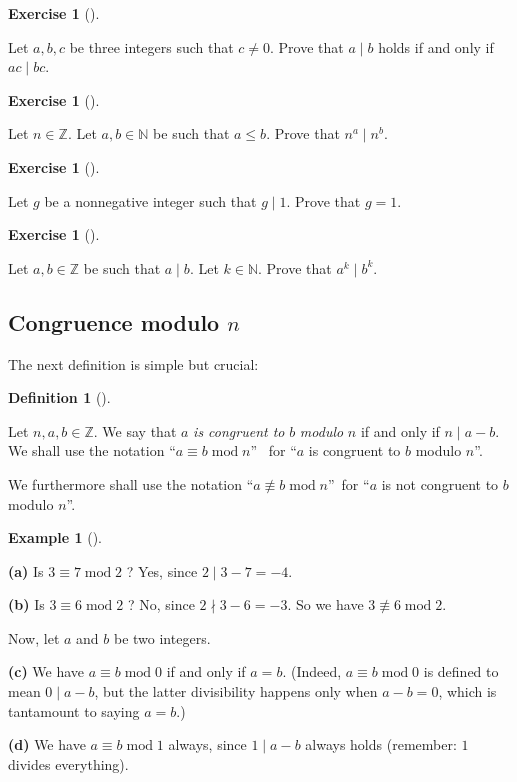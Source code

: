 \documentclass[numbers=enddot,12pt,final,onecolumn,notitlepage]{scrartcl}%
\newcounter{exer}
\numberwithin{exer}{subsection}
\theoremstyle{definition}
\newtheorem{defi}[theo]{Definition}
\newenvironment{definition}[1][]
{\begin{defi}[#1]\begin{leftbar}}
{\end{leftbar}\end{defi}}
\newtheorem{exam}[theo]{Example}
\newenvironment{example}[1][]
{\begin{exam}[#1]\begin{leftbar}}
{\end{leftbar}\end{exam}}
\newtheorem{exmp}[exer]{Exercise}
\newenvironment{exercise}[1][]
{\begin{exmp}[#1]\begin{leftbar}}
{\end{leftbar}\end{exmp}}
\begin{document}
\begin{exercise}
\label{exe.ent.div.acbc}Let $a,b,c$ be three integers such that $c\neq0$.
Prove that $a\mid b$ holds if and only if $ac\mid bc$.
\end{exercise}

\begin{exercise}
\label{exe.ent.div.powers}Let $n\in\mathbb{Z}$. Let $a,b\in\mathbb{N}$ be such
that $a\leq b$. Prove that $n^{a}\mid n^{b}$.
\end{exercise}

\begin{exercise}
\label{exe.ent.div.g|1}Let $g$ be a nonnegative integer such that $g\mid1$.
Prove that $g=1$.
\end{exercise}

\begin{exercise}
\label{exe.ent.div.powers-ab}Let $a,b\in\mathbb{Z}$ be such that $a\mid b$.
Let $k\in\mathbb{N}$. Prove that $a^{k}\mid b^{k}$.
\end{exercise}

\subsection{Congruence modulo $n$}

The next definition is simple but crucial:

\begin{definition}
\label{def.ent.cong}Let $n,a,b\in\mathbb{Z}$. We say that $a$ \textit{is
congruent to }$b$ \textit{modulo }$n$ if and only if $n\mid a-b$. We shall use
the notation \textquotedblleft$a\equiv b\operatorname{mod}n$\textquotedblright%
\ for \textquotedblleft$a$ is congruent to $b$ modulo $n$\textquotedblright.

We furthermore shall use the notation \textquotedblleft$a\not \equiv
b\operatorname{mod}n$\textquotedblright\ for \textquotedblleft$a$ is not
congruent to $b$ modulo $n$\textquotedblright.
\end{definition}

\begin{example}
\label{exa.ent.cong.triv}\textbf{(a)} Is $3\equiv7\operatorname{mod}2$ ? Yes,
since $2\mid3-7=-4$.

\textbf{(b)} Is $3\equiv6\operatorname{mod}2$ ? No, since $2\nmid3-6=-3$. So
we have $3\not \equiv 6\operatorname{mod}2$.

Now, let $a$ and $b$ be two integers.

\textbf{(c)} We have $a\equiv b\operatorname{mod}0$ if and only if $a=b$.
(Indeed, $a\equiv b\operatorname{mod}0$ is defined to mean $0\mid a-b$, but
the latter divisibility happens only when $a-b=0$, which is tantamount to
saying $a=b$.)

\textbf{(d)} We have $a\equiv b\operatorname{mod}1$ always, since $1\mid a-b$
always holds (remember: $1$ divides everything).
\end{example}
\end{document}
